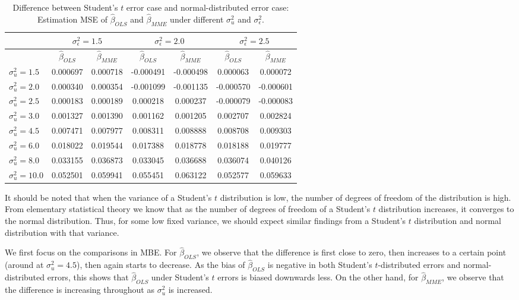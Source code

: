 \documentclass{article}
\begin{document}
\begin{table}[ht]
    \centering
    \caption{Difference between Student's $t$ error case and normal-distributed error case: Estimation MSE of $\hat{\beta}_{OLS}$ and $\hat{\beta}_{MME}$ under different $\sigma^2_u$ and $\sigma^2_\epsilon$.}
    \label{Tab:MSE_diff_t_normal}
    \begin{tabular}[t]{lcccccc}
        \hline
        &\multicolumn{2}{c}{$\sigma^2_\epsilon=1.5$}&\multicolumn{2}{c}{$\sigma^2_\epsilon=2.0$}&\multicolumn{2}{c}{$\sigma^2_\epsilon=2.5$}\\
        \hline
        &$\hat{\beta}_{OLS}$&$\hat{\beta}_{MME}$&$\hat{\beta}_{OLS}$&$\hat{\beta}_{MME}$&$\hat{\beta}_{OLS}$&$\hat{\beta}_{MME}$\\
        \hline
        $\sigma^2_u = 1.5$&0.000697&0.000718&-0.000491&-0.000498&0.000063&0.000072\\
        $\sigma^2_u = 2.0$&0.000340&0.000354&-0.001099&-0.001135&-0.000570&-0.000601\\
        $\sigma^2_u = 2.5$&0.000183&0.000189&0.000218&0.000237&-0.000079&-0.000083\\
        $\sigma^2_u = 3.0$&0.001327&0.001390&0.001162&0.001205&0.002707&0.002824\\
        $\sigma^2_u = 4.5$&0.007471&0.007977&0.008311&0.008888&0.008708&0.009303\\
        $\sigma^2_u = 6.0$&0.018022&0.019544&0.017388&0.018778&0.018188&0.019777\\
        $\sigma^2_u = 8.0$&0.033155&0.036873&0.033045&0.036688&0.036074&0.040126\\
        $\sigma^2_u = 10.0$&0.052501&0.059941&0.055451&0.063122&0.052577&0.059633\\
        \hline
    \end{tabular}
\end{table}

It should be noted that when the variance of a Student's $t$ distribution is low, the number of degrees of freedom of the distribution is high. 
From elementary statistical theory we know that as the number of degrees of freedom of a Student's $t$ distribution increases, it converges to the normal distribution.
Thus, for some low fixed variance, we should expect similar findings from a Student's $t$ distribution and normal distribution with that variance.

We first focus on the comparisons in MBE.
For $\hat{\beta}_{OLS}$, we observe that the difference is first close to zero, then increases to a certain point (around at $\sigma^2_u = 4.5$), then again starts to decrease.
As the bias of $\hat{\beta}_{OLS}$ is negative in both Student's $t$-distributed errors and normal-distributed errors, this shows that $\hat{\beta}_{OLS}$ under Student's $t$ errors is biased downwards less.
On the other hand, for $\hat{\beta}_{MME}$, we observe that the difference is increasing throughout as $\sigma^2_u$ is increased. 
\end{document}
